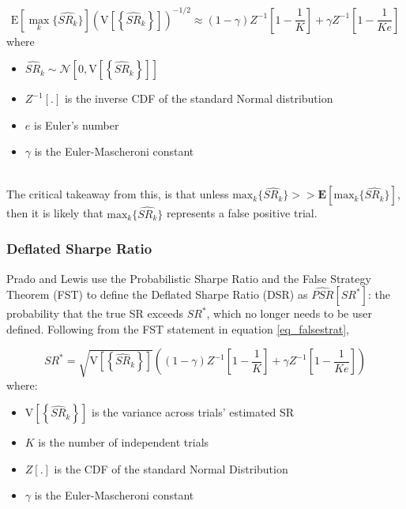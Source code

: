 \documentclass[a4paper,11pt,oneside]{article}
\theoremstyle{plain}
\theoremstyle{definition}
\begin{document}
	\begin{equation}\label{eq_falsestrat}
		\mathrm{E}\left[{\max_k}\{\widehat{SR_k}\}\right]\left(\mathrm{V}\left[\left\{\widehat{S R}_{k}\right\}\right]\right)^{-1 / 2}\approx(1-\gamma) Z^{-1}\left[1-\frac{1}{K}\right]+\gamma Z^{-1}\left[1-\frac{1}{K e}\right]	
	\end{equation}
		where
	\begin{itemize}
		\item [] $\widehat{S R}_{k} \sim \mathcal{N}\left[0, \mathrm{V}\left[\left\{\widehat{S R}_{k}\right\}\right]\right]$
		\item [] $Z^{-1}[.]$ is the inverse CDF of the standard Normal distribution
		\item [] $e$ is Euler's number
		\item [] $\gamma$ is the Euler-Mascheroni constant
	\end{itemize}
	~\\
	The critical takeaway from this, is that unless $\mathrm{max}_k\{\widehat{SR_k}\} >> \mathbf{E}\left[\mathrm{max}_k\{\widehat{SR_k}\}\right]$, then it is likely that $\mathrm{max}_k\{\widehat{SR_k}\}$ represents a false positive trial.
		
		
	
	\subsubsection{Deflated Sharpe Ratio}
	
	Prado and Lewis use the Probabilistic Sharpe Ratio and the False Strategy Theorem (FST) to define the Deflated Sharpe Ratio (DSR) as $\widehat{PSR}[SR^*]$: the probability that the true SR exceeds $SR^*$, which no longer needs to be user defined. Following from the FST statement in equation \ref{eq_falsestrat}, 
	
	\begin{equation}\label{eq_dsr}
	SR^{*}=\sqrt{\mathrm{V}\left[\left\{\widehat{S R}_{k}\right\}\right]}\left((1-\gamma) Z^{-1}\left[1-\frac{1}{K}\right]+\gamma Z^{-1}\left[1-\frac{1}{K e}\right]\right)
	\end{equation}
	where:
	\begin{itemize}
		\item [] $\mathrm{V}\left[\left\{\widehat{S R}_{k}\right\}\right]$ is the variance across trials' estimated SR
		\item [] $K$ is the number of independent trials
		\item [] $Z[.]$ is the CDF of the standard Normal Distribution 
		\item [] $\gamma$ is the Euler-Mascheroni constant
	\end{itemize}
	
\end{document}
